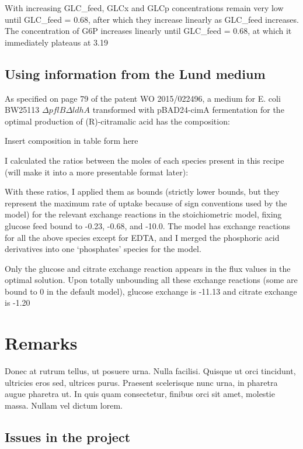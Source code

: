 \documentclass[parskip=full]{scrreprt}
\begin{document}
With increasing GLC\_feed, GLCx and GLCp concentrations remain very low until GLC\_feed = 0.68, after which they increase linearly as GLC\_feed increases. The concentration of G6P increases linearly until GLC\_feed = 0.68, at which it immediately plateaus at 3.19

\section{Using information from the Lund medium}
\label{sec:lund}

As specified on page 79 of the patent WO 2015/022496, a medium for E. coli BW25113 $\Delta{}pflB\Delta{}ldhA$ transformed with pBAD24-cimA fermentation for the optimal production of (R)-citramalic acid has the composition:

Insert composition in table form here

I calculated the ratios between the moles of each species present in this recipe (will make it into a more presentable format later):

With these ratios, I applied them as bounds (strictly lower bounds, but they represent the maximum rate of uptake because of sign conventions used by the model) for the relevant exchange reactions in the stoichiometric model, fixing glucose feed bound to -0.23, -0.68, and -10.0. The model has exchange reactions for all the above species except for EDTA, and I merged the phosphoric acid derivatives into one ‘phosphates’ species for the model.

Only the glucose and citrate exchange reaction appears in the flux values in the optimal solution. Upon totally unbounding all these exchange reactions (some are bound to 0 in the default model), glucose exchange is -11.13 and citrate exchange is -1.20

\chapter{Remarks}
\label{ch:remarks}

Donec at rutrum tellus, ut posuere urna. Nulla facilisi. Quisque ut orci tincidunt, ultricies eros sed, ultrices purus. Praesent scelerisque nunc urna, in pharetra augue pharetra ut. In quis quam consectetur, finibus orci sit amet, molestie massa. Nullam vel dictum lorem. 

\section{Issues in the project}
\label{sec:issues}
\end{document}
